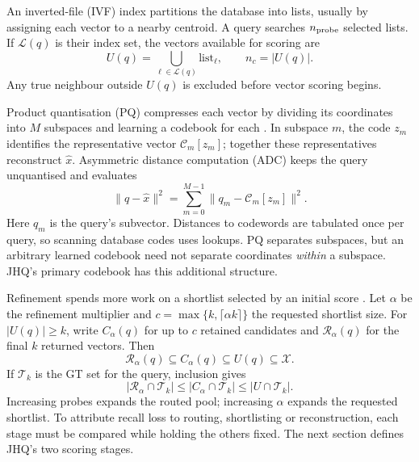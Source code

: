 An inverted-file (IVF) index partitions the database into lists, usually
by assigning each vector to a nearby centroid. A query searches
$n_{\rm probe}$ selected lists. If $\mathcal L(q)$ is their index set,
the vectors available for scoring are
\[
 U(q)=\bigcup_{\ell\in\mathcal L(q)}\mathrm{list}_\ell,\qquad n_c=|U(q)|.
\]
Any true neighbour outside $U(q)$ is excluded before vector scoring begins.

Product quantisation (PQ) compresses each vector by dividing its coordinates
into $M$ subspaces and learning a codebook for each \cite{pq}. In subspace
$m$, the code $z_m$ identifies the representative vector
$\mathcal C_m[z_m]$; together these representatives reconstruct
$\widehat x$. Asymmetric distance computation (ADC) keeps the query
unquantised and evaluates
\begin{equation}
 \|q-\widehat x\|^2=\sum_{m=0}^{M-1}\|q_m-\mathcal C_m[z_m]\|^2.
 \label{eq:2-adc}
\end{equation}
Here $q_m$ is the query's subvector. Distances to codewords are tabulated
once per query, so scanning database codes uses lookups. PQ separates
subspaces, but an arbitrary learned codebook need not separate coordinates
\emph{within} a subspace. JHQ's primary codebook has this additional structure.

Refinement spends more work on a shortlist selected by an initial score
\cite{johnson_gpu,faiss_refine}. Let $\alpha$ be the refinement multiplier
and $c=\max\{k,\lceil\alpha k\rceil\}$ the requested shortlist size.
For $|U(q)|\geq k$, write $C_\alpha(q)$ for up to $c$ retained candidates
and $\mathcal R_\alpha(q)$ for the final $k$ returned vectors. Then
\begin{equation}
 \mathcal R_\alpha(q)\subseteq C_\alpha(q)\subseteq U(q)\subseteq\mathcal X.
 \label{eq:2-cascade}
\end{equation}
If $\mathcal T_k$ is the GT set for the query, inclusion gives
\[
 |\mathcal R_\alpha\cap\mathcal T_k|
 \leq |C_\alpha\cap\mathcal T_k|
 \leq |U\cap\mathcal T_k|.
\]
Increasing probes expands the routed pool; increasing $\alpha$ expands
the requested shortlist. To attribute recall loss to routing, shortlisting
or reconstruction, each stage must be compared while holding the others
fixed. The next section defines JHQ's two scoring stages.
